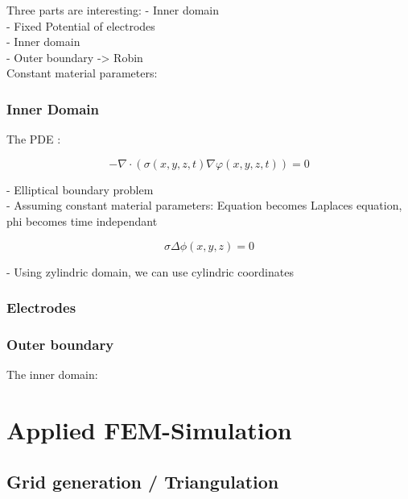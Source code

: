 \documentclass[parskip=half, titlepage=yes, 12pt, BCOR=12mm, DIV=calc]{scrartcl}
\begin{document}
Three parts are interesting:
- Inner domain \\
- Fixed Potential of electrodes \\
- Inner domain \\
- Outer boundary -> Robin \\

Constant material parameters: \\

\subsubsection{Inner Domain}

The PDE : 

\begin{equation}
    - \nabla \cdot (\sigma(x,y,z,t) \nabla \varphi(x,y,z,t)) = 0
\end{equation}

- Elliptical boundary problem \\
- Assuming constant material parameters: Equation becomes Laplaces equation, phi becomes time independant

\begin{equation}
    \sigma \Delta \phi(x,y,z) = 0
\end{equation}

- Using zylindric domain, we can use cylindric coordinates



\subsubsection{Electrodes}

\subsubsection{Outer boundary}

The inner domain: 
\begin{equation}
    
\end{equation}



\section{Applied FEM-Simulation}

\subsection{Grid generation / Triangulation}
\end{document}
